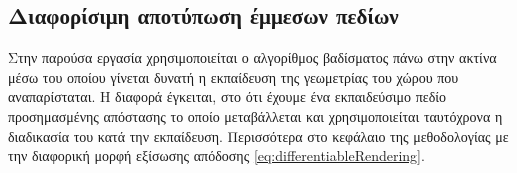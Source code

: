 \subsection{Διαφορίσιμη αποτύπωση έμμεσων πεδίων  }
Στην παρούσα εργασία χρησιμοποιείται ο αλγορίθμος βαδίσματος πάνω στην ακτίνα  μέσω του οποίου γίνεται δυνατή η εκπαίδευση της γεωμετρίας του χώρου που αναπαρίσταται. Η διαφορά έγκειται, στο ότι έχουμε ένα εκπαιδεύσιμο πεδίο προσημασμένης απόστασης το οποίο μεταβάλλεται και χρησιμοποιείται ταυτόχρονα η διαδικασία του  κατά την εκπαίδευση. Περισσότερα στο κεφάλαιο της μεθοδολογίας με την διαφορική μορφή εξίσωσης απόδοσης \ref{eq:differentiableRendering}.
\clearpage

